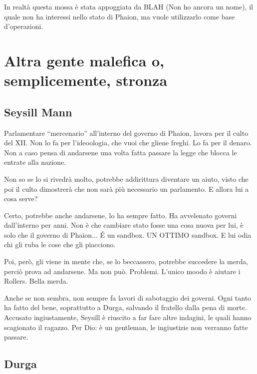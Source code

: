 \documentclass[9pt,a4paper,cleardoubleempty]{scrbook}
\begin{document}
          In realtà questa mossa è stata appoggiata da BLAH (Non ho ancora
          un nome), il quale non ha interessi nello stato di Phaion, ma
          vuole utilizzarlo come base d'operazioni.

      
      \section{Altra gente malefica o, semplicemente, stronza}
        
        \subsection{Seysill Mann}
          Parlamentare ``mercenario'' all'interno del governo di Phaion,
          lavora per il culto del XII. Non lo fa per l'ideoologia, che vuoi
          che gliene freghi. Lo fa per il denaro. Non a caso pensa di
          andarsene una volta fatta passare la legge che blocca le entrate
          alla nazione.

          Non so se lo si rivedrà molto, potrebbe addirittura diventare un
          aiuto, visto che poi il culto dimostrerà che non sarà più
          necessario un parlamento. E allora lui a cosa serve?

          Certo, potrebbe anche andarsene, lo ha sempre fatto. Ha
          avvelenato governi dall'interno per anni. Non è che cambiare
          stato fosse una cosa nuova per lui, è solo che il governo di
          Phaion... \'E un sandbox. UN OTTIMO sandbox. E lui odia chi gli
          ruba le cose che gli piacciono.

          Poi, però, gli viene in mente che, se lo beccassero, potrebbe
          succedere la merda, perciò prova ad andarsene. Ma non può.
          Problemi. L'unico moodo è aiutare i Rollers. Bella merda.

          Anche se non sembra, non sempre fa lavori di sabotaggio dei
          governi. Ogni tanto ha fatto del bene, soprattutto a Durga,
          salvando il fratello dalla pena di morte. Accusato ingiustamente,
          Seysill è riuscito a far fare altre indagini, le quali hanno
          scagionato il ragazzo. Per Dio: è un gentleman, le ingiustizie
          non verranno fatte passare.
        
        \subsection{Durga}
          
\end{document}
